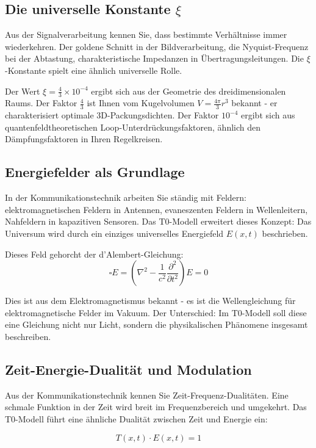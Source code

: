 \subsection{Die universelle Konstante $\xi$}

Aus der Signalverarbeitung kennen Sie, dass bestimmte Verhältnisse immer wiederkehren. Der goldene Schnitt in der Bildverarbeitung, die Nyquist-Frequenz bei der Abtastung, charakteristische Impedanzen in Übertragungsleitungen. Die $\xi$-Konstante spielt eine ähnlich universelle Rolle.

Der Wert $\xi = \frac{4}{3} \times 10^{-4}$ ergibt sich aus der Geometrie des dreidimensionalen Raums. Der Faktor $\frac{4}{3}$ ist Ihnen vom Kugelvolumen $V = \frac{4\pi}{3}r^3$ bekannt - er charakterisiert optimale 3D-Packungsdichten. Der Faktor $10^{-4}$ ergibt sich aus quantenfeldtheoretischen Loop-Unterdrückungsfaktoren, ähnlich den Dämpfungsfaktoren in Ihren Regelkreisen.

\subsection{Energiefelder als Grundlage}

In der Kommunikationstechnik arbeiten Sie ständig mit Feldern: elektromagnetischen Feldern in Antennen, evaneszenten Feldern in Wellenleitern, Nahfeldern in kapazitiven Sensoren. Das T0-Modell erweitert dieses Konzept: Das Universum wird durch ein einziges universelles Energiefeld $E(x,t)$ beschrieben.

Dieses Feld gehorcht der d'Alembert-Gleichung:
$$\square E = \left(\nabla^2 - \frac{1}{c^2}\frac{\partial^2}{\partial t^2}\right) E = 0$$

Dies ist aus dem Elektromagnetismus bekannt - es ist die Wellengleichung für elektromagnetische Felder im Vakuum. Der Unterschied: Im T0-Modell soll diese eine Gleichung nicht nur Licht, sondern die physikalischen Phänomene insgesamt beschreiben.

\subsection{Zeit-Energie-Dualität und Modulation}

Aus der Kommunikationstechnik kennen Sie Zeit-Frequenz-Dualitäten. Eine schmale Funktion in der Zeit wird breit im Frequenzbereich und umgekehrt. Das T0-Modell führt eine ähnliche Dualität zwischen Zeit und Energie ein:

$$T(x,t) \cdot E(x,t) = 1$$

